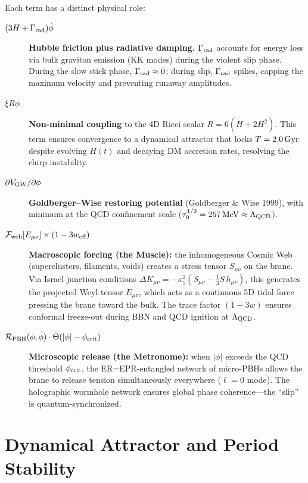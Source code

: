 Each term has a distinct physical role:

\begin{description}
  \item[$(3H + \Gamma_\text{rad})\dot{\phi}$] \textbf{Hubble friction plus radiative damping.} $\Gamma_\text{rad}$ accounts for energy loss via bulk graviton emission (KK modes) during the violent slip phase. During the slow stick phase, $\Gamma_\text{rad} \approx 0$; during slip, $\Gamma_\text{rad}$ spikes, capping the maximum velocity and preventing runaway amplitudes.

  \item[$\xi R\phi$] \textbf{Non-minimal coupling} to the 4D Ricci scalar $R = 6(\dot{H} + 2H^2)$. This term ensures convergence to a dynamical attractor that locks $T = 2.0\,\text{Gyr}$ despite evolving $H(t)$ and decaying DM accretion rates, resolving the chirp instability.

  \item[$\partial V_\text{GW}/\partial\phi$] \textbf{Goldberger--Wise restoring potential} (Goldberger \& Wise 1999), with minimum at the QCD confinement scale ($\tau_0^{1/3} = 257\,\text{MeV} \approx \Lambda_\text{QCD}$).

  \item[{$\mathcal{F}_\text{web}[E_{\mu\nu}] \times (1 - 3w_\text{eff})$}] \textbf{Macroscopic forcing (the Muscle):} the inhomogeneous Cosmic Web (superclusters, filaments, voids) creates a stress tensor $S_{\mu\nu}$ on the brane. Via Israel junction conditions $\Delta K_{\mu\nu} = -\kappa_5^2(S_{\mu\nu} - \tfrac{1}{3}S\,h_{\mu\nu})$, this generates the projected Weyl tensor $E_{\mu\nu}$, which acts as a continuous 5D tidal force pressing the brane toward the bulk. The trace factor $(1-3w)$ ensures conformal freeze-out during BBN and QCD ignition at $\Lambda_\text{QCD}$.

  \item[{$\mathcal{R}_\text{PBH}(\phi,\dot{\phi})\cdot\Theta(|\phi| - \phi_\text{crit})$}] \textbf{Microscopic release (the Metronome):} when $|\phi|$ exceeds the QCD threshold $\phi_\text{crit}$, the ER=EPR-entangled network of micro-PBHs allows the brane to release tension simultaneously everywhere ($\ell=0$ mode). The holographic wormhole network ensures global phase coherence---the ``slip'' is quantum-synchronized.
\end{description}

\section{Dynamical Attractor and Period Stability}
\label{sec:attractor}

